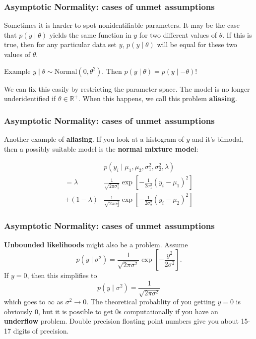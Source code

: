 \documentclass{beamer}
\begin{document}
\begin{frame}
\frametitle{Asymptotic Normality: cases of unmet assumptions}

Sometimes it is harder to spot nonidentifiable parameters. It may be the case that $p(y \mid \theta)$ yields the same function in $y$ for two different values of $\theta$. If this is true, then for any particular data set $y$, $p(y \mid \theta)$ will be equal for these two values of $\theta$.
\newline

Example $y \mid \theta \sim \text{Normal}(0, \theta^2)$. Then $p(y \mid \theta) = p(y \mid -\theta)$!
\newline

We can fix this easily by restricting the parameter space. The model is no longer underidentified if $\theta \in \mathbb{R}^+$. When this happens, we call this problem {\bf aliasing}.

\end{frame}

\begin{frame}
\frametitle{Asymptotic Normality: cases of unmet assumptions}

Another example of {\bf aliasing}. If you look at a histogram of $y$ and it's bimodal, then a possibly suitable model is the {\bf normal mixture model}:

\begin{align*}
&p(y_i \mid \mu_1, \mu_2, \sigma_1^2, \sigma_2^2, \lambda) \\
= \lambda &\frac{1}{\sqrt{2\pi \sigma_1^2}} \exp\left[-\frac{1}{2 \sigma_1^2}(y_i - \mu_1)^2 \right] \\
+ (1-\lambda) &\frac{1}{\sqrt{2\pi \sigma_2^2}}\exp\left[-\frac{1}{2 \sigma_2^2}(y_i - \mu_2)^2 \right]
\end{align*}
\end{frame}


\begin{frame}
\frametitle{Asymptotic Normality: cases of unmet assumptions}

{\bf Unbounded likelihoods} might also be a problem. Assume 
\[
p(y \mid \sigma^2) = \frac{1}{\sqrt{2 \pi \sigma^2}}\exp\left[ -\frac{y^2}{2 \sigma^2} \right].
\]
If $y=0$, then this simplifies to
\[
p(y \mid \sigma^2) = \frac{1}{\sqrt{2 \pi \sigma^2}}
\]
which goes to $\infty$ as $\sigma^2 \to 0$. The theoretical probablity of you getting $y=0$ is obviously $0$, but it is possible to get $0$s computationally if you have an {\bf underflow} problem. Double precision floating point numbers give you about 15-17 digits of precision. 


\end{frame}
\end{document}

